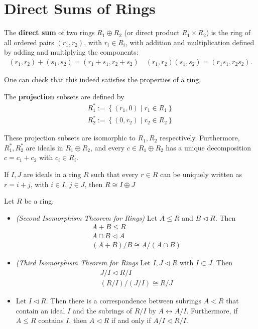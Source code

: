 \documentclass{memoir}
\begin{document}
\section{Direct Sums of Rings}
\label{sec:direct_sums_of_rings}
\begin{defn}
	The \textbf{direct sum} of two rings \(R_1\oplus R_2\) (or direct product \(R_1\times R_2\)) is the ring of all ordered pairs \((r_1,r_2)\), with \(r_i \in R_i\), with addition and multiplication defined by adding and multiplying the components:
	\begin{align*}
		(r_1,r_2) + (s_1,s_2) = (r_1+s_1,r_2+s_2) \quad (r_1,r_2)(s_1,s_2) = (r_1s_1,r_2s_2).
	\end{align*}
\end{defn}
One can check that this indeed satisfies the properties of a ring.
\begin{defn}[Projection]
	The \textbf{projection} subsets are defined by
	\begin{align*}
		R_1^* := \left\{(r_1,0) \mid r_1 \in R_1 \right\} \\
		R_2^* := \left\{(0,r_2) \mid r_2 \in R_2 \right\} 
	\end{align*}
\end{defn}
These projection subsets are isomorphic to \(R_1,R_2\) respectively. Furthermore, \(R_1^{*},R_2^{*}\) are ideals in \(R_1\oplus R_2\), and every \(c \in R_1 \oplus R_2\) has a unique decomposition \(c = c_1 + c_2\) with \(c_i \in R_i\).
\begin{prop}
	If \(I,J\) are ideals in a ring \(R\) such that every \(r \in R\) can be uniquely written as \(r = i + j\), with \(i \in I\), \(j \in J\), then \(R \cong I\oplus J\)
\end{prop}

\begin{thm}
	Let \(R\) be a ring.
	\begin{itemize}
		\item \textit{(Second Isomorphism Theorem for Rings)} Let \(A\leq R\) and \(B \triangleleft R\). Then
			\begin{align*}
				A+B \leq R\\
				A\cap B \triangleleft A\\
				(A+B) / B \cong A / (A\cap B)
			\end{align*}
	\item \textit{(Third Isomorphism Theorem for Rings} Let \(I,J \triangleleft R\) with \(I\subset J\). Then 
		\begin{align*}
			J / I \triangleleft R / I\\
			(R / I) / (J / I) \cong R / J
		\end{align*}
	\item Let \(I \triangleleft R\). Then there is a correspondence between subrings \(A<R\) that contain an ideal \(I\) and the subrings of \(R / I\) by \(A \leftrightarrow A / I\). Furthermore, if \(A\leq R\) contains \(I\), then \(A \triangleleft R\) if and only if \(A / I \triangleleft R / I\).
	\end{itemize}
\end{thm}
\end{document}
